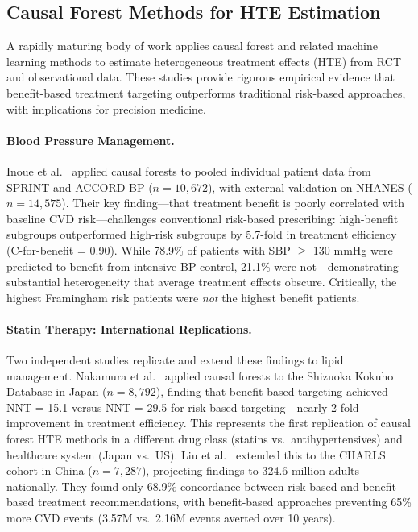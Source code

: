 \documentclass[runningheads]{llncs}
\begin{document}
\subsection{Causal Forest Methods for HTE Estimation}\label{sec:causalforest}

A rapidly maturing body of work applies causal forest and related
machine learning methods to estimate heterogeneous treatment effects
(HTE) from RCT and observational data.
These studies provide rigorous empirical evidence that benefit-based
treatment targeting outperforms traditional risk-based approaches,
with implications for precision medicine.

\paragraph{Blood Pressure Management.}
Inoue et al.~\cite{inoue2023causalforest} applied causal forests to
pooled individual patient data from SPRINT and ACCORD-BP
($n = 10{,}672$), with external validation on NHANES ($n = 14{,}575$).
Their key finding---that treatment benefit is poorly correlated with
baseline CVD risk---challenges conventional risk-based prescribing:
high-benefit subgroups outperformed high-risk subgroups by 5.7-fold
in treatment efficiency (C-for-benefit = 0.90).
While 78.9\% of patients with SBP $\geq$ 130 mmHg were predicted to
benefit from intensive BP control, 21.1\% were not---demonstrating
substantial heterogeneity that average treatment effects obscure.
Critically, the highest Framingham risk patients were \emph{not}
the highest benefit patients.

\paragraph{Statin Therapy: International Replications.}
Two independent studies replicate and extend these findings to lipid
management.
Nakamura et al.~\cite{nakamura2025statin} applied causal forests to
the Shizuoka Kokuho Database in Japan ($n = 8{,}792$), finding that
benefit-based targeting achieved NNT = 15.1 versus NNT = 29.5 for
risk-based targeting---nearly 2-fold improvement in treatment
efficiency.
This represents the first replication of causal forest HTE methods
in a different drug class (statins vs.\ antihypertensives) and
healthcare system (Japan vs.\ US).
Liu et al.~\cite{liu2025china} extended this to the CHARLS cohort
in China ($n = 7{,}287$), projecting findings to 324.6 million
adults nationally.
They found only 68.9\% concordance between risk-based and
benefit-based treatment recommendations, with benefit-based
approaches preventing 65\% more CVD events (3.57M vs.\ 2.16M
events averted over 10 years).
\end{document}
